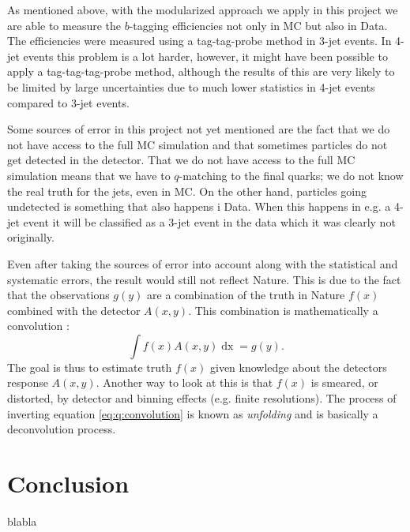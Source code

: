 As mentioned above, with the modularized approach we apply in this project we are able to measure the $b$-tagging efficiencies not only in MC but also in Data. The efficiencies were measured using a tag-tag-probe method in 3-jet events. In 4-jet events this problem is a lot harder, however, it might have been possible to apply a tag-tag-tag-probe method, although the results of this are very likely to be limited by large uncertainties due to much lower statistics in 4-jet events compared to 3-jet events. 

Some sources of error in this project not yet mentioned are the fact that we do not have access to the full MC simulation and that sometimes particles do not get detected in the detector. That we do not have access to the full MC simulation means that we have to $q$-matching to the final quarks; we do not know the real truth for the jets, even in MC. On the other hand, particles going undetected is something that also happens i Data. When this happens in e.g. a 4-jet event it will be classified as a 3-jet event in the data which it was clearly not originally. 

Even after taking the sources of error into account along with the statistical and systematic errors, the result would still not reflect Nature. This is due to the fact that the observations $g(y)$ are a combination of the truth in Nature $f(x)$ combined with the detector $A(x, y)$. This combination is mathematically a convolution \autocite{schmittDataUnfoldingMethods2017}: 
\begin{equation}
  \label{eq:q:convolution}
  \int f(x) A(x, y) \mathop{dx} = g(y).
\end{equation}
The goal is thus to estimate truth $f(x)$ given knowledge about the detectors response $A(x,y)$. Another way to look at this is that $f(x)$ is smeared, or distorted, by detector and binning effects (e.g. finite resolutions). The process of inverting equation \eqref{eq:q:convolution} is known as \emph{unfolding} and is basically a deconvolution process. 

\section{Conclusion}
\label{sec:q:conclusion}

blabla